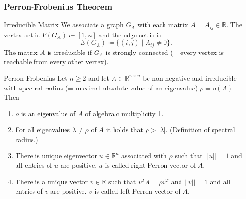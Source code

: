 \documentclass[english]{panikzettel}
\begin{document}

\subsubsection{Perron-Frobenius Theorem}

\begin{defi}{Irreducible Matrix}
We associate a graph $G_A$ with each matrix $A=A_{ij}\in\mathbb{R}$. The vertex set is $V(G_A)\coloneqq [1,n]$ and the edge set is is
\[
E(G_A)\coloneqq \{(i,j)\mid A_{ij}\neq 0 \}.
\]
The matrix $A$ is irreducible if $G_A$ is strongly connected (= every vertex is reachable from every other vertex).
\end{defi}

\begin{theo}{Perron-Frobenius}
Let $n\geq 2$ and let $A\in\mathbb{R}^{n\times n}$ be non-negative and irreducible with spectral radius (= maximal absolute value of an eigenvalue) $\rho=\rho(A)$. Then
\begin{enumerate}
\item $\rho$ is an eigenvalue of $A$ of algebraic multiplicity 1.
\item For all eigenvalues $\lambda\neq \rho$ of $A$ it holds that $\rho > |\lambda|$. (Definition of spectral radius.)
\item There is unique eigenvector $u\in\mathbb{R}^n$ associated with $\rho$ such that $||u||=1$ and all entries of $u$ are positive. $u$ is called right Perron vector of $A$.
\item There is a unique vector $v\in\mathbb{R}$ such that $v^TA=\rho v^T$ and $||v||=1$ and all entries of $v$ are positive. $v$ is called left Perron vector of $A$.
\end{enumerate}
\end{theo}
\end{document}
